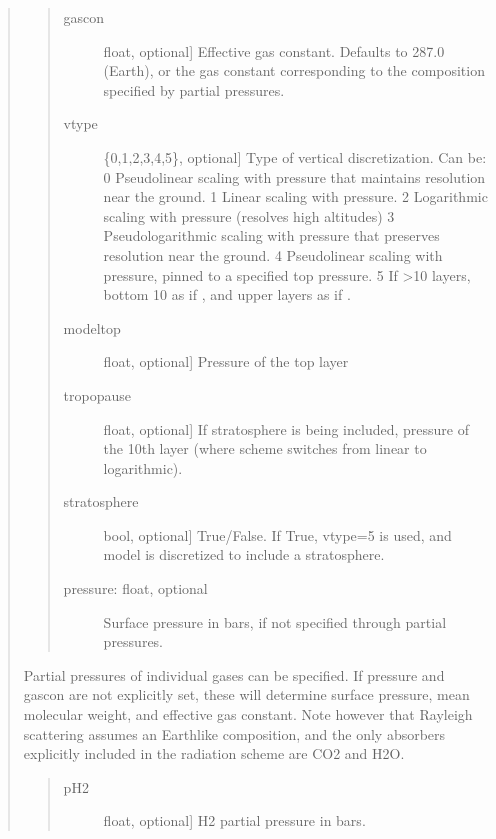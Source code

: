 \documentclass[letterpaper,10pt,english]{sphinxmanual}
\begin{document}
\begin{fulllineitems}
\begin{fulllineitems}
\begin{quote}
\begin{quote}
\begin{description}
\end{description}
\end{quote}

\begin{quote}
\begin{description}
\item[{gascon}] \leavevmode{[}float, optional{]}
Effective gas constant. Defaults to 287.0 (Earth), or the gas constant
corresponding to the composition specified by partial pressures.

\item[{vtype}] \leavevmode{[}\{0,1,2,3,4,5\}, optional{]}
Type of vertical discretization. Can be:
0   Pseudolinear scaling with pressure that maintains resolution near the ground.
1   Linear scaling with pressure.
2   Logarithmic scaling with pressure (resolves high altitudes)
3   Pseudologarithmic scaling with pressure that preserves resolution near the ground.
4   Pseudolinear scaling with pressure, pinned to a specified top pressure.
5   If \textgreater{}10 layers, bottom 10 as if , and upper layers as if .

\item[{modeltop}] \leavevmode{[}float, optional{]}
Pressure of the top layer

\item[{tropopause}] \leavevmode{[}float, optional{]}
If stratosphere is being included, pressure of the 10th layer (where scheme
switches from linear to logarithmic).

\item[{stratosphere}] \leavevmode{[}bool, optional{]}
True/False. If True, vtype=5 is used, and model is discretized to include
a stratosphere.

\item[{pressure: float, optional}] \leavevmode
Surface pressure in bars, if not specified through partial pressures.

\end{description}
\end{quote}


Partial pressures of individual gases can be specified. If pressure and gascon are not explicitly set, these will determine surface pressure, mean molecular weight, and effective gas constant. Note however that Rayleigh scattering assumes an Earth\sphinxhyphen{}like composition, and the only absorbers explicitly included in the radiation scheme are CO2 and H2O.
\begin{quote}
\begin{description}
\item[{pH2}] \leavevmode{[}float, optional{]}
H2 partial pressure in bars.


\end{description}
\end{quote}
\end{quote}
\end{fulllineitems}
\end{fulllineitems}
\end{document}
